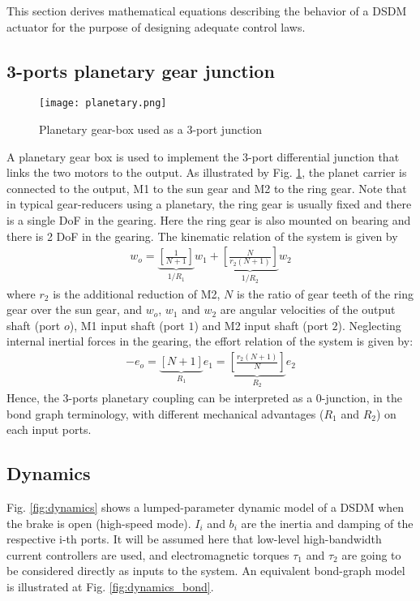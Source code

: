 This section derives mathematical equations describing the behavior of a DSDM actuator for the purpose of designing adequate control laws. 

\subsection{3-ports planetary gear junction}

\begin{figure}[htp]
	\centering
		\texttt{[image: planetary.png]}
	\caption{Planetary gear-box used as a 3-port junction}
	\label{fig:planetary}
\end{figure}

A planetary gear box is used to implement the 3-port differential junction that links the two motors to the output. As illustrated by Fig. \ref{fig:planetary}, the planet carrier is connected to the output, M1 to the sun gear and M2 to the ring gear. Note that in typical gear-reducers using a planetary, the ring gear is usually fixed and there is a single DoF in the gearing. Here the ring gear is also mounted on bearing and there is 2 DoF in the gearing. The kinematic relation of the system is given by
%
\begin{align}
	w_o = 
	\underbrace{ \left[ 
	\frac{ 1 }{N+1}
	\right] }_{  1/R_1  }
	w_1 + 
	\underbrace{ \left[ 
	\frac{ N  }{r_2 (N+1)}
	\right] }_{  1/R_2  }
	w_2
\label{eq:kinematic}
\end{align}
%
where $r_2$ is the additional reduction of M2, $N$ is the ratio of gear teeth of the ring gear over the sun gear, and $w_o$, $w_1$ and $w_2$ are angular velocities of the output shaft (port $o$), M1 input shaft (port $1$) and M2 input shaft (port $2$). Neglecting internal inertial forces in the gearing, the effort relation of the system is given by:
%
\begin{align}
	- e_o =
	\underbrace{ \left[ 
	N+1
	\right] }_{ R_1  }
	e_1 = 
	\underbrace{ \left[ 
	\frac{r_2(N+1)}{N}
	\right] }_{ R_2  }
	e_2
	\label{eq:torque}
\end{align}
%
Hence, the 3-ports planetary coupling can be interpreted as a 0-junction, in the bond graph terminology, with different mechanical advantages ($R_1$ and $R_2$) on each input ports. 

\subsection{Dynamics}
\label{sec:dyn}

Fig. \ref{fig:dynamics} shows a lumped-parameter dynamic model of a DSDM when the brake is open (high-speed mode). $I_i$ and $b_i$ are the inertia and damping of the respective i-th ports. It will be assumed here that low-level high-bandwidth current controllers are used, and electromagnetic torques $\tau_1$ and $\tau_2$ are going to be considered directly as inputs to the system. An equivalent bond-graph model is illustrated at Fig. \ref{fig:dynamics_bond}.

